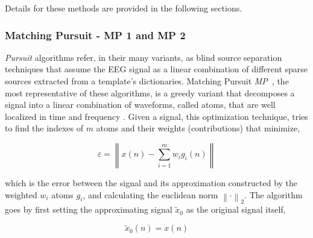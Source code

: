 \vspace{8pt}

Details for these methods are provided in the following sections.  


\subsubsection{Matching Pursuit - MP 1 and MP 2}

\textit{Pursuit} algorithms refer, in their many variants, as blind source separation \cite{Vincent2010} techniques that assume the EEG signal as a linear combination of different sparse sources extracted from a template's dictionaries.  Matching Pursuit \textit{MP}~\cite{Mallat1993}, the most representative of these algorithms, is a greedy variant that decomposes a signal into a linear combination of waveforms, called atoms, that are well localized in time and frequency \cite{ChandranKS2016}.  Given a signal, this optimization technique, tries to find the indexes of $m$ atoms and their weights (contributions) that minimize,


\begin{equation}
\varepsilon =  \left\lVert   x(n) - \sum_{i=1}^{m} w_i g_{i}(n)   \right\rVert
\label{eq:mperror}
\end{equation}

\noindent which is the error between the signal and its approximation constructed by the weighted $w_i$ atoms $g_{i}$, and calculating the euclidean norm ${\left\lVert \cdot \right\rVert}_{2}$.  The algorithm goes by first setting the approximating signal $\tilde{x}_{0}$  as the original signal itself,  

\begin{equation}
\tilde{x}_{0}(n) = x(n)
\label{eq:mp2}
\end{equation}

